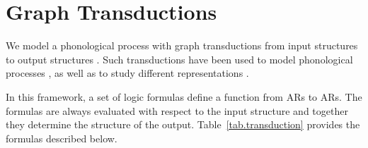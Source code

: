 \documentclass[pmlr]{jmlr}%
\begin{document}
	\vspace{-2ex}
	
	\section{Graph Transductions}
	
	We model a phonological process with graph transductions
	from input structures to output structures
	\citep{Courcelle1994, EngelfrietHoogeboom2001, CourcelleEngelfriet2012}.
	Such transductions have been used to model phonological processes
	\citep{Strother-Garcia-2018, Dolatian-2020-diss, chandleejardine21bmrs},
	as well as to study different representations
	\citep{strother2019diss, oakdenNotationalEquivalenceTonal2020,
		jardineetal20qtheoryAP, Danis2025}.
	
	In this framework, a set of logic formulas define a function from ARs to ARs.
	The formulas are always evaluated with respect to the input structure and together they 
	determine the structure of the output.
	Table~\ref{tab.transduction} provides the formulas described below.
\end{document}
